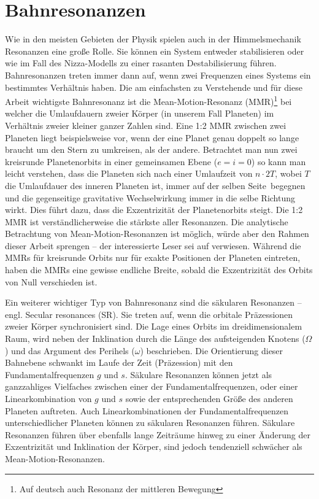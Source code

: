 \documentclass[12pt,a4paper,twoside,open=right,bibliography=totoc]{scrbook}
\renewcommand{\cite}{ \citep}
\begin{document}
\section{Bahnresonanzen}\label{resonanzen}
Wie in den meisten Gebieten der Physik spielen auch in der Himmelsmechanik Resonanzen eine große Rolle. Sie können ein System entweder stabilisieren oder wie im Fall des Nizza-Modells zu einer rasanten Destabilisierung führen.
Bahnresonanzen treten immer dann auf, wenn zwei Frequenzen eines Systems ein bestimmtes Verhältnis haben.
Die am einfachsten zu Verstehende und für diese Arbeit wichtigste Bahnresonanz ist die Mean-Motion-Resonanz (MMR)\footnote{Auf deutsch auch Resonanz der mittleren Bewegung} bei welcher die Umlaufdauern zweier Körper (in unserem Fall Planeten) im Verhältnis zweier kleiner ganzer Zahlen sind.
Eine 1:2 MMR zwischen zwei Planeten liegt beispielsweise vor, wenn der eine Planet genau doppelt so lange braucht um den Stern zu umkreisen, als der andere. Betrachtet man nun zwei kreisrunde Planetenorbits in einer gemeinsamen Ebene ($e=i=0$) so kann man leicht verstehen, dass die Planeten sich nach einer Umlaufzeit von $n\cdot 2T$, wobei $T$ die Umlaufdauer des inneren Planeten ist, immer auf der \glqq selben Seite\grqq\ begegnen und die gegenseitige gravitative Wechselwirkung immer in die selbe Richtung wirkt. Dies führt dazu, dass die Exzentrizität der Planetenorbits steigt. Die 1:2 MMR ist verständlicherweise die stärkste aller Resonanzen.
Die analytische Betrachtung von Mean-Motion-Resonanzen ist möglich, würde aber den Rahmen dieser Arbeit sprengen -- der interessierte Leser sei auf \cite{Dvorak2005,Murray2010} verwiesen. %
Während die MMRs für kreisrunde Orbits nur für exakte Positionen der Planeten eintreten, haben die MMRs eine gewisse endliche Breite, sobald die Exzentrizität des Orbits von Null verschieden ist.

Ein weiterer wichtiger Typ von Bahnresonanz sind die säkularen Resonanzen – engl. Secular resonances (SR). Sie treten auf, wenn die orbitale Präzessionen zweier Körper synchronisiert sind.
Die Lage eines Orbits im dreidimensionalem Raum, wird neben der Inklination durch die Länge des aufsteigenden Knotens ($\Omega$) und das Argument des Perihels ($\omega$) beschrieben. Die Orientierung dieser Bahnebene schwankt im Laufe der Zeit (Präzession) mit den Fundamentalfrequenzen $g$ und $s$. Säkulare Resonanzen können jetzt als ganzzahliges Vielfaches zwischen einer der Fundamentalfrequenzen, oder einer Linearkombination von $g$ und $s$ sowie der entsprechenden Größe des anderen Planeten auftreten. Auch Linearkombinationen der Fundamentalfrequenzen unterschiedlicher Planeten können zu säkularen Resonanzen führen.
Säkulare Resonanzen führen über ebenfalls lange Zeiträume hinweg zu einer Änderung der Exzentrizität und Inklination der Körper, sind jedoch tendenziell schwächer als Mean-Motion-Resonanzen.
\end{document}
